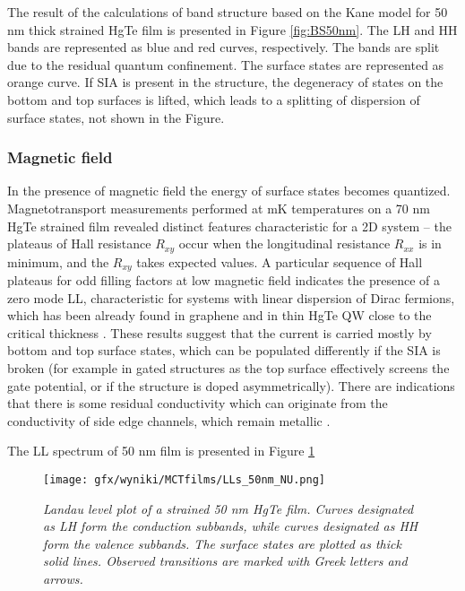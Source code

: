 \documentclass[titlepage,a4paper]{book}
\newcommand{\wciecie}{\quad\phantom{v}}
\begin{document}
The result of the calculations of band structure based on the Kane model for 50 nm thick strained HgTe film is presented in Figure \ref{fig:BS50nm}. The LH and HH bands are represented as blue and red curves, respectively. The bands are split due to the residual quantum confinement. The surface states are represented as orange curve. If SIA is present in the structure, the degeneracy of states on the bottom and top surfaces is lifted, which leads to a splitting of dispersion of surface states, not shown in the Figure.   

\subsubsection{Magnetic field}
\wciecie
In the presence of magnetic field the energy of surface states becomes quantized. Magnetotransport measurements performed at mK temperatures \cite{Brune_State2} on a 70 nm HgTe strained film revealed distinct features characteristic for a 2D system -- the plateaus of Hall resistance $R_{xy}$ occur when the longitudinal resistance $R_{xx}$ is in minimum, and the $R_{xy}$ takes expected values. A particular sequence of Hall plateaus for odd filling factors at low magnetic field indicates the presence of a zero mode LL, characteristic for systems with linear dispersion of Dirac fermions, which has been already found in graphene \cite{Castro_graphene} and in thin HgTe QW close to the critical thickness \cite{Zholudev_MCT_QW}. These results suggest that the current is carried mostly by bottom and top surface states, which can be populated differently if the SIA is broken (for example in gated structures as the top surface effectively screens the gate potential, or if the structure is doped asymmetrically). There are indications that there is some residual conductivity which can originate from the conductivity of side edge channels, which remain metallic \cite{Chu_MCT_layers}. 

The LL spectrum of 50 nm film is presented in Figure \ref{fig:LL_50nm}

\begin{figure}[ht]
	\centering
	\texttt{[image: gfx/wyniki/MCTfilms/LLs\_50nm\_NU.png]}
	\vspace{-10pt}
	\caption{\textit{Landau level plot of a strained 50 nm HgTe film. Curves designated as LH form the conduction subbands, while curves designated as HH form the valence subbands. The surface states are plotted as thick solid lines. Observed transitions are marked with Greek letters and arrows.}}
	\label{fig:LL_50nm}
\end{figure} 
\end{document}
